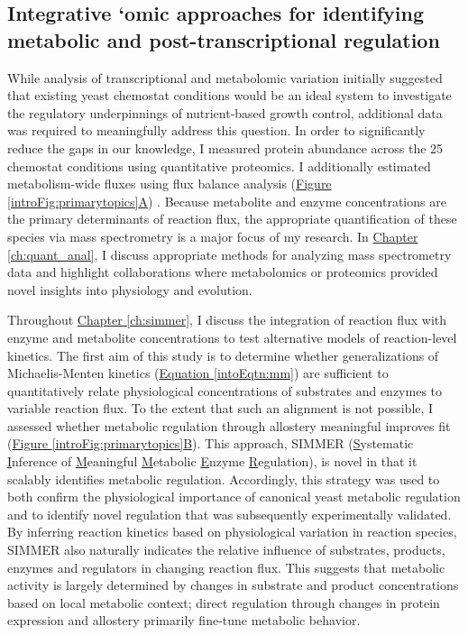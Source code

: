 \subsection{Integrative `omic approaches for identifying metabolic and post-transcriptional regulation}

While analysis of transcriptional and metabolomic variation initially suggested that existing yeast chemostat conditions would be an ideal system to investigate the regulatory underpinnings of nutrient-based growth control, additional data was required to meaningfully address this question. In order to significantly reduce the gaps in our knowledge, I measured protein abundance across the 25 chemostat conditions using quantitative proteomics. I additionally estimated metabolism-wide fluxes using flux balance analysis (\hyperref[introFig:primarytopics]{Figure \ref{introFig:primarytopics}A}) \cite{Orth:2010hb}. Because metabolite and enzyme concentrations are the primary determinants of reaction flux, the appropriate quantification of these species via mass spectrometry is a major focus of my research. In \hyperref[ch:quant_anal]{Chapter \ref{ch:quant_anal}}, I discuss appropriate methods for analyzing mass spectrometry data and highlight collaborations where metabolomics or proteomics provided novel insights into physiology and evolution. 

Throughout \hyperref[ch:simmer]{Chapter \ref{ch:simmer}}, I discuss the integration of reaction flux with enzyme and metabolite concentrations to test alternative models of reaction-level kinetics. The first aim of this study is to determine whether generalizations of Michaelis-Menten kinetics (\hyperref[intoEqtn:mm]{Equation \ref{intoEqtn:mm}}) \cite{Liebermeister:2006fm} are sufficient to quantitatively relate physiological concentrations of substrates and enzymes to variable reaction flux.  To the extent that such an alignment is not possible, I assessed whether metabolic regulation through allostery meaningful improves fit (\hyperref[introFig:primarytopics]{Figure \ref{introFig:primarytopics}B}).  This approach, SIMMER (\underline{S}ystematic \underline{I}nference of \underline{M}eaningful \underline{M}etabolic \underline{E}nzyme \underline{R}egulation), is novel in that it scalably identifies metabolic regulation. Accordingly, this strategy was used to both confirm the physiological importance of canonical yeast metabolic regulation and to identify novel regulation that was subsequently experimentally validated. By inferring reaction kinetics based on physiological variation in reaction species, SIMMER also naturally indicates the relative influence of substrates, products, enzymes and regulators in changing reaction flux. This suggests that metabolic activity is largely determined by changes in substrate and product concentrations based on local metabolic context; direct regulation through changes in protein expression and allostery primarily fine-tune metabolic behavior.

